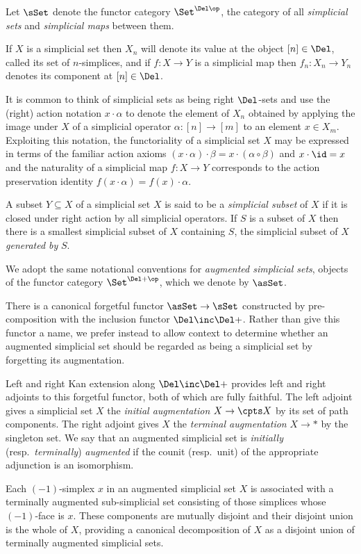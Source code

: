     \begin{ntn}\label{ntn:simplicial-sets}
        Let $\sSet$ denote the functor category $\Set^{\Del\op}$,  the category of all {\em simplicial sets\/} and {\em simplicial maps\/} between them. 

        If $X$ is a simplicial set then $X_n$ will denote its value at the object $[n]\in\Del$, called its set of $n$-simplices, and if $f\colon X\to Y$ is a simplicial map then $f_n\colon X_n\to Y_n$ denotes its component at $[n]\in\Del$.

        It is common to think of simplicial sets as being right $\Del$-sets and use the (right) action notation $x\cdot\alpha$ to denote the element of $X_n$ obtained by applying the image under $X$ of a simplicial operator $\alpha \colon [n] \to [m]$ to an element $x\in X_m$. Exploiting this notation,  the functoriality of a simplicial set $X$ may be expressed in terms of the familiar action axioms $(x\cdot\alpha)\cdot\beta = x\cdot(\alpha\circ\beta)$ and $x\cdot\id = x$ and the naturality of a simplicial map $f\colon X\to Y$ corresponds to the action preservation identity $f(x\cdot\alpha)=f(x)\cdot\alpha$. 

A subset $Y\subseteq X$ of a simplicial set $X$ is said to be a {\em simplicial subset\/} of $X$ if it is closed  under  right action by all simplicial operators. If $S$ is a subset of $X$ then there is a smallest simplicial subset of $X$ containing $S$, the simplicial subset of $X$ {\em generated by\/} $S$.

We adopt the same notational conventions for {\em augmented simplicial sets}, objects of the functor category $\Set^{\Del+\op}$, which we denote by $\asSet$.
    \end{ntn}

    \begin{rec}[augmentation]\label{rec:augmentation}
       There is a canonical forgetful functor $\asSet\to\sSet$ constructed by pre-composition with the inclusion functor $\Del\inc\Del+$. Rather than give this functor a name, we prefer instead to allow context to determine whether an augmented simplicial set should be regarded as being a simplicial set by forgetting its augmentation. 

        Left and right Kan extension along $\Del\inc\Del+$ provides left and right adjoints to this forgetful functor, both of which are fully faithful. The left adjoint gives a simplicial set $X$ the {\em initial augmentation\/} $X\to\cpts X$ by its set of path components. The right adjoint gives $X$ the {\em terminal augmentation\/} $X\to {*}$ by the singleton set. We say that an augmented simplicial set is {\em initially\/} (resp.~{\em terminally}) {\em augmented\/} if the counit (resp.~unit) of the appropriate adjunction is  an isomorphism.

        Each $(-1)$-simplex $x$ in an augmented simplicial set $X$ is associated with a terminally augmented sub-simplicial set consisting of those simplices whose $(-1)$-face is $x$. These components are mutually disjoint and their disjoint union is the whole of $X$, providing a canonical decomposition of $X$ as a disjoint union of terminally augmented simplicial sets.
    \end{rec}

